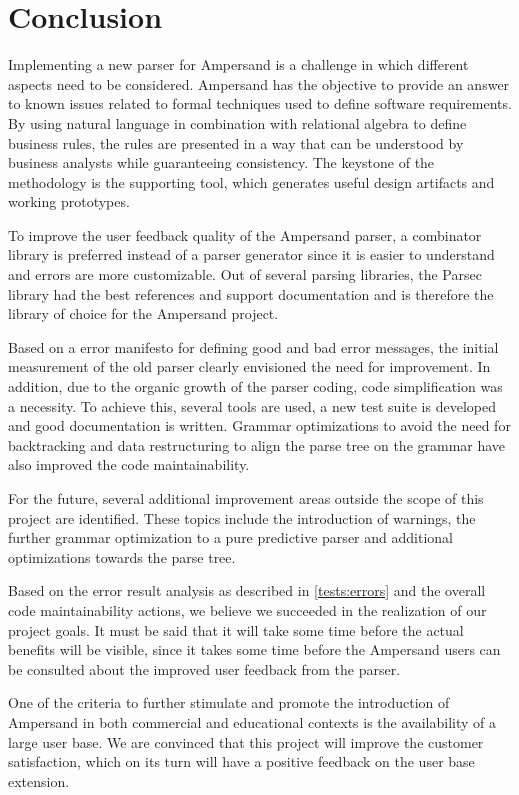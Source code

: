 
\section{Conclusion}
\label{sec:conclusion}
Implementing a new parser for Ampersand is a challenge in which different aspects need to be considered.
Ampersand has the objective to provide an answer to known issues related to formal techniques used to define software requirements.
By using natural language in combination with relational algebra to define business rules, the rules are presented in a way that can be understood by business analysts while guaranteeing consistency.
The keystone of the methodology is the supporting tool, which generates useful design artifacts and working prototypes.

To improve the user feedback quality of the Ampersand parser, a combinator library is preferred instead of a parser generator since it is easier to understand and errors are more customizable.
Out of several parsing libraries, the Parsec library had the best references and support documentation and is therefore the library of choice for the Ampersand project.

Based on a error manifesto for defining good and bad error messages, the initial measurement of the old parser clearly envisioned the need for improvement.
In addition, due to the organic growth of the parser coding, code simplification was a necessity.
To achieve this, several tools are used, a new test suite is developed and good documentation is written.
Grammar optimizations to avoid the need for backtracking and data restructuring to align the parse tree on the grammar have also improved the code maintainability.

For the future, several additional improvement areas outside the scope of this project are identified.
These topics include the introduction of warnings, the further grammar optimization to a pure predictive parser and additional optimizations towards the parse tree.

Based on the error result analysis as described in \autoref{tests:errors} and the overall code maintainability actions, we believe we succeeded in the realization of our project goals.
It must be said that it will take some time before the actual benefits will be visible, since it takes some time before the Ampersand users can be consulted about the improved user feedback from the parser.

One of the criteria to further stimulate and promote the introduction of Ampersand in both commercial and educational contexts is the availability of a large user base.
We are convinced that this project will improve the customer satisfaction, which on its turn will have a positive feedback on the user base extension.
